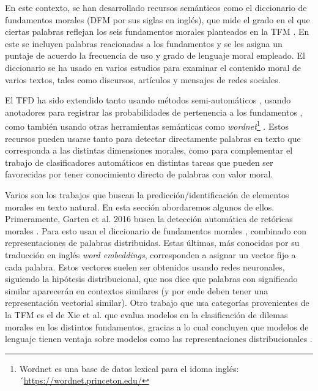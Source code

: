 \documentclass[
	spanish, %
	letterpaper, oneside
]{article}
\begin{document}
\newp En este contexto, se han desarrollado recursos semánticos como el diccionario de fundamentos morales (DFM por sus siglas en inglés), que mide el grado en el que ciertas palabras reflejan los seis fundamentos morales planteados en la TFM \cite{tfd}. En este se incluyen palabras reacionadas a los fundamentos y se les asigna un puntaje de acuerdo  la frecuencia de uso y grado de lenguaje moral empleado. El diccionario se ha usado en varios estudios para examinar el contenido moral de varios textos, tales como discursos, artículos y mensajes de redes sociales. 

\newp El TFD ha sido extendido tanto usando métodos semi-automáticos \cite{tfde}, usando anotadores para registrar las probabilidades de pertenencia a los fundamentos \cite{etfd}, como también usando otras herramientas semánticas como \textit{wordnet}\footnote{Wordnet es una base de datos lexical para el idoma inglés: ´\url{https://wordnet.princeton.edu/}} \cite{moral_strength}. Estos recursos pueden usarse tanto para detectar directamente palabras en texto que corresponda a las distintas dimensiones morales, como para complementar el trabajo de clasificadores automáticos en distintas tareas que pueden ser favorecidas por tener conocimiento directo de palabras con valor moral.



Varios son los trabajos que buscan la predicción/identificación de elementos morales en texto natural. En esta sección abordaremos algunos de ellos. Primeramente, Garten et al. 2016 busca la detección automática de retóricas morales \cite{garten}. Para esto usan el diccionario de fundamentos morales \cite{tfd}, combinado con representaciones de palabras distribuidas. Estas últimas, más conocidas por su traducción en inglés \textit{word embeddings}, corresponden a asignar un vector fijo a cada palabra. Estos vectores suelen ser obtenidos usando redes neuronales, siguiendo la hipótesis distribucional, que nos dice que palabras con significado similar aparecerán en contextos similares (y por ende deben tener una representación vectorial similar). Otro trabajo que usa categorías provenientes de la TFM es el de Xie et al. que evalua modelos en la clasificación de dilemas morales en los distintos fundamentos, gracias a lo cual concluyen que modelos de lenguaje tienen ventaja sobre modelos como las representaciones distribucionales \cite{xie}.
\end{document}
